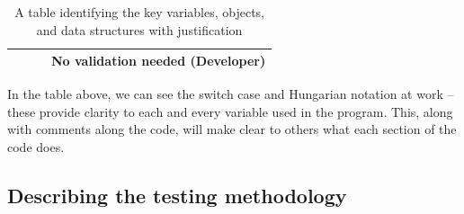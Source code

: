 \documentclass[9pt]{article}
\begin{document}
\begin{table}[H]
\begin{tabularx}{\textwidth}{llXX}
		                       &                    &                                                                                                                                                   & No validation needed (Developer)                                                                                     \\ \hline
	\end{tabularx}
	\caption{A table identifying the key variables, objects, and data structures with justification}
	\label{tab_keyItems}
\end{table}
In the table above, we can see the switch case and Hungarian notation at work -- these provide clarity to each and every variable used in the program. This, along with comments along the code, will make clear to others what each section of the code does.
\newpage
\subsection{Describing the testing methodology}
\end{document}
